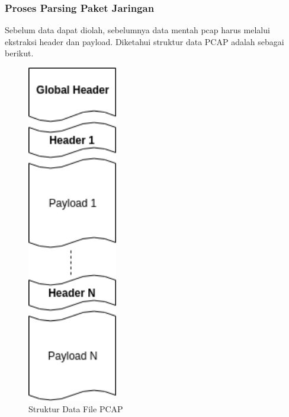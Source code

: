 \documentclass[./skripsi.tex]{subfiles}
\begin{document}
\subsubsection{Proses Parsing Paket Jaringan}
\par Sebelum data dapat diolah, sebelumnya data mentah pcap harus melalui ekstraksi header dan payload. Diketahui struktur data PCAP adalah sebagai berikut.
\begin{figure}%
\centering
\includegraphics[width=0.35\textwidth]{public/assets/img/PCAPStruktur.png}
\caption{Struktur Data File PCAP}
\label{fig:pcapstruktur}
\end{figure}
\end{document}
